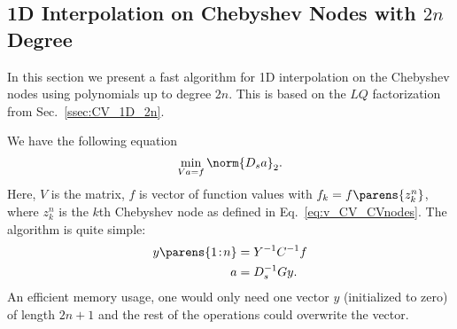 \subsection{1D Interpolation on Chebyshev Nodes with $2n$ Degree}
\label{ssec:fa_I_1D_2n}

In this section we present a fast algorithm for 1D interpolation
on the Chebyshev nodes using polynomials up to degree $2n$.
This is based on the $LQ$ factorization from Sec.~\ref{ssec:CV_1D_2n}.

We have the following equation
%
\begin{equation}
    \min_{Va=f}\norm{D_{s}a}_{2}.
\end{equation}
%
Here, $V$ is the \CV{} matrix, $f$ is vector of function values 
with $f_{k} = f\parens{z_{k}^{n}}$, where $z_{k}^{n}$ is the $k$th
Chebyshev node as defined in Eq.~\eqref{eq:v_CV_CVnodes}.
The algorithm is quite simple:
%
\begin{align}
    y\parens{1\!:\!n} &= Y^{-1}C^{-1}f \nonumber\\
    a &= D_{s}^{-1}Gy.
\end{align}
%
An efficient memory usage, one would only need one vector
$y$ (initialized to zero) of length $2n+1$
and the rest of the operations could overwrite the vector.



